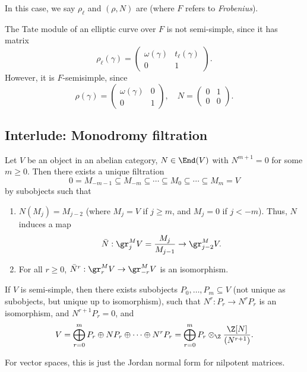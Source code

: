\documentclass[a4paper]{article}
\begin{document}
In this case, we say $\rho_\ell$ and $(\rho, N)$ are  (where $F$ refers to \emph{Frobenius}).

\begin{eg}
  The Tate module of an elliptic curve over $F$ is not semi-simple, since it has matrix
  \[
    \rho_\ell(\gamma) =
    \begin{pmatrix}
      \omega(\gamma) & t_\ell(\gamma)\\
      0 & 1
    \end{pmatrix}.
  \]
  However, it is $F$-semisimple, since
  \[
    \rho(\gamma) = 
    \begin{pmatrix}
      \omega(\gamma) & 0\\
      0 & 1
    \end{pmatrix},\quad N =
    \begin{pmatrix}
      0 & 1\\
      0 & 0
    \end{pmatrix}.
  \]
\end{eg}
\subsection{Interlude: Monodromy filtration}
\begin{thm}
  Let $V$ be an object in an abelian category, $N \in \End(V)$ with $N^{m + 1} = 0$ for some $m \geq 0$. Then there exists a unique filtration
  \[
    0 = M_{-m - 1} \subseteq M_{-m} \subseteq \cdots \subseteq M_0 \subseteq \cdots \subseteq M_m = V
  \]
  by subobjects such that
  \begin{enumerate}
    \item $N(M_j) = M_{j - 2}$ (where $M_j = V$ if $j \geq m$, and $M_j = 0$ if $j < -m$). Thus, $N$ induces a map
      \[
        \bar{N}: \gr_j^M V = \frac{M_j}{M_{j - 1}} \to \gr_{j - 2}^M V.
      \]
    \item For all $r \geq 0$, $\bar{N}^r: \gr_r^M V \to \gr_{-r}^M V$ is an isomorphism.
  \end{enumerate}
\end{thm}

\begin{cor}
  If $V$ is semi-simple, then there exists subobjects $P_0, \ldots, P_m \subseteq V$ (not unique as subobjects, but unique up to isomorphism), such that $N^r: P_r \to N^r P_r$ is an isomorphism, and $N^{r + 1} P_r = 0$, and
  \[
    V = \bigoplus_{r = 0}^m P_r \oplus N P_r \oplus \cdots \oplus N^r P_r = \bigoplus_{r = 0}^m P_r \otimes_\Z \frac{\Z[N]}{(N^{r + 1})}.
  \]
\end{cor}
For vector spaces, this is just the Jordan normal form for nilpotent matrices.
\end{document}
